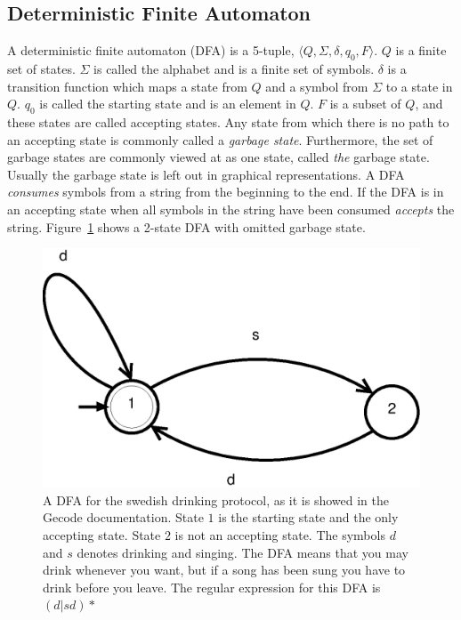 \documentclass[a4paper,11pt]{article}
\begin{document}
\subsection{Deterministic Finite Automaton}
A deterministic finite automaton (DFA) is a 5-tuple, $\langle Q,\Sigma,\delta,q_0, F\rangle$. $Q$ is a finite set of states. $\Sigma$ is called the alphabet and is a finite set of symbols. $\delta$ is a transition function which maps a state from $Q$ and a symbol from $\Sigma$ to a state in $Q$. $q_0$ is called the starting state and is an element in $Q$. $F$ is a subset of $Q$, and these states are called accepting states. Any state from which there is no path to an accepting state is commonly called a \textit{garbage state}. Furthermore, the set of garbage states are commonly viewed at as one state, called \textit{the} garbage state. Usually the garbage state is left out in graphical representations. A DFA \textit{consumes} symbols from a string from the beginning to the end. If the DFA is in an accepting state when all symbols in the string have been consumed \textit{accepts} the string. Figure~\ref{fig:dfasdp} shows a 2-state DFA with omitted garbage state.

\begin{figure}[H]
\centering
\includegraphics{dfa.eps}
\caption{A DFA for the swedish drinking protocol, as it is showed in the Gecode documentation. State $1$ is the starting state and the only accepting state. State $2$ is not an accepting state. The symbols $d$ and $s$ denotes drinking and singing. The DFA means that you may drink whenever you want, but if a song has been sung you have to drink before you leave. The regular expression for this DFA is $(d|sd)*$}
\label{fig:dfasdp}
\end{figure}
\end{document}

